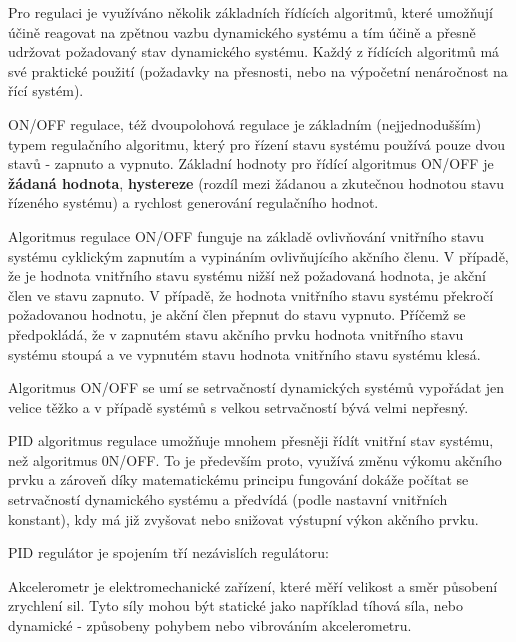 
Pro regulaci je využíváno několik základních řídících algoritmů, které umožňují účině reagovat na zpětnou vazbu dynamického systému a tím účině a přesně udržovat požadovaný stav dynamického systému. Každý z řídících algoritmů má své praktické použití (požadavky na přesnosti, nebo na výpočetní nenáročnost na řící systém). 


ON/OFF regulace, též dvoupolohová regulace je základním (nejjednodušším) typem regulačního algoritmu, který pro řízení stavu systému používá pouze dvou stavů - zapnuto a vypnuto. Základní hodnoty pro řídící algoritmus ON/OFF je {\bf žádaná hodnota}, {\bf hystereze} (rozdíl mezi žádanou a zkutečnou hodnotou stavu řízeného systému) a rychlost generování regulačního hodnot.

Algoritmus regulace ON/OFF funguje na základě ovlivňování vnitřního stavu systému cyklickým zapnutím a vypináním ovlivňujícího akčního členu. V případě, že je hodnota vnitřního stavu systému nižší než požadovaná hodnota, je akční člen ve stavu zapnuto. V případě, že hodnota vnitřního stavu systému překročí požadovanou hodnotu, je akční člen přepnut do stavu vypnuto. Příčemž se předpokládá, že v zapnutém stavu akčního prvku hodnota vnitřního stavu systému stoupá a ve vypnutém stavu hodnota vnitřního stavu systému klesá. 


Algoritmus ON/OFF se umí se setrvačností dynamických systémů vypořádat jen velice těžko a v případě systémů s velkou setrvačností bývá velmi nepřesný. 


PID algoritmus regulace umožňuje mnohem přesněji řídít vnitřní stav systému, než algoritmus 0N/OFF.  To je především proto, využívá změnu výkomu akčního prvku a zároveň díky matematickému principu fungování dokáže počítat se setrvačností dynamického systému a předvídá (podle nastavní vnitřních konstant), kdy má již zvyšovat nebo snižovat výstupní výkon akčního prvku. 

PID regulátor je spojením tří nezávislích regulátoru:

\vskip 4mm
\vskip 4mm




Akcelerometr je elektromechanické zařízení, které měří velikost a směr působení zrychlení sil. Tyto síly mohou být statické jako například tíhová síla, nebo dynamické - způsobeny pohybem nebo vibrováním akcelerometru.

